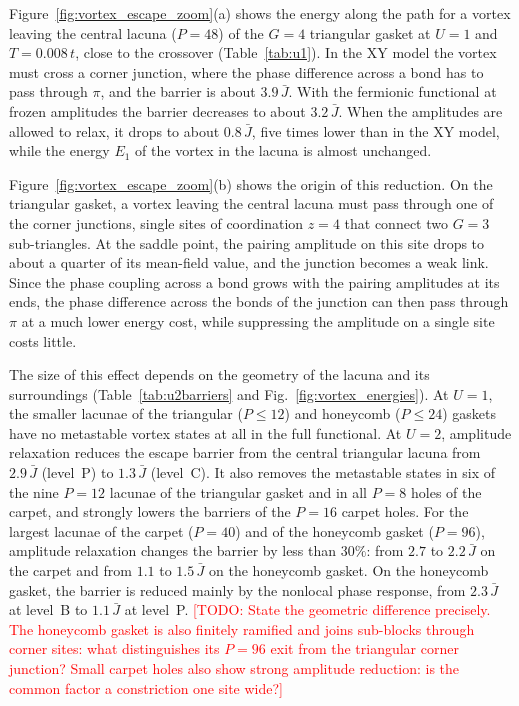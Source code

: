 \documentclass[aps,prb,twocolumn,superscriptaddress,floatfix]{revtex4-2}
\newcommand{\Jb}{\bar{J}}
\newcommand{\todo}[1]{\textcolor{red}{[TODO: #1]}}
\begin{document}
Figure~\ref{fig:vortex_escape_zoom}(a) shows the energy along the path for a
vortex leaving the central lacuna ($P = 48$) of the $G = 4$ triangular gasket
at $U = 1$ and $T = 0.008\,t$, close to the crossover (Table~\ref{tab:u1}). In
the XY model the vortex must cross a corner junction, where the phase
difference across a bond has to pass through $\pi$, and the barrier is about
$3.9\,\Jb$. With the fermionic functional at frozen amplitudes the barrier
decreases to about $3.2\,\Jb$. When the amplitudes are allowed to relax, it
drops to about $0.8\,\Jb$, five times lower than in the XY model, while the
energy $E_1$ of the vortex in the lacuna is almost unchanged.

Figure~\ref{fig:vortex_escape_zoom}(b) shows the origin of this reduction. On
the triangular gasket, a vortex leaving the central lacuna must pass through
one of the corner junctions, single sites of coordination $z = 4$ that connect
two $G = 3$ sub-triangles. At the saddle point, the pairing amplitude on this
site drops to about a quarter of its mean-field value, and the junction
becomes a weak link. Since the phase coupling across a bond grows with the
pairing amplitudes at its ends, the phase difference across the bonds of the
junction can then pass through $\pi$ at a much lower energy cost, while
suppressing the amplitude on a single site costs little.

The size of this effect depends on the geometry of the lacuna and its
surroundings (Table~\ref{tab:u2barriers} and Fig.~\ref{fig:vortex_energies}).
At $U = 1$, the smaller lacunae of the triangular ($P \le 12$) and honeycomb
($P \le 24$) gaskets have no metastable vortex states at all in the full
functional. At $U = 2$, amplitude relaxation reduces the escape barrier from
the central triangular lacuna from $2.9\,\Jb$ (level~P) to $1.3\,\Jb$
(level~C). It also removes the metastable states in six of the nine $P = 12$
lacunae of the triangular gasket and in all $P = 8$ holes of the carpet, and
strongly lowers the barriers of the $P = 16$ carpet holes. For the largest
lacunae of the carpet ($P = 40$) and of the honeycomb gasket ($P = 96$),
amplitude relaxation changes the barrier by less than $30\%$: from $2.7$ to
$2.2\,\Jb$ on the carpet and from $1.1$ to $1.5\,\Jb$ on the honeycomb gasket.
On the honeycomb gasket, the barrier is reduced mainly by the nonlocal phase
response, from $2.3\,\Jb$ at level~B to $1.1\,\Jb$ at level~P.
\todo{State the geometric difference precisely. The honeycomb gasket is also
finitely ramified and joins sub-blocks through corner sites: what distinguishes
its $P=96$ exit from the triangular corner junction? Small carpet holes also
show strong amplitude reduction: is the common factor a constriction one site
wide?}
\end{document}
